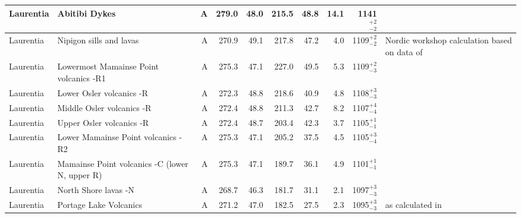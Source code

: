 \begin{longtable}{p{1 in}p{1 in}rrrrrrrp{1.5 in}}
                     Laurentia &                                    Abitibi Dykes &      A &     279.0 &      48.0 & 215.5 &  48.8 &      14.1 &     1141$^{+2}_{-2}$ &                                  \cite{Ernst1993a} \\ \hline
                     Laurentia &                          Nipigon sills and lavas &      A &     270.9 &      49.1 & 217.8 &  47.2 &       4.0 &     1109$^{+2}_{-2}$ &  Nordic workshop calculation based on data of \cite{Palmer1970a, Robertson1971a, Pesonen1979a, Pesonen1979b, Middleton2004a, Borradaile2006a} \\ \hline
                     Laurentia &           Lowermost Mamainse Point volcanics -R1 &      A &     275.3 &      47.1 & 227.0 &  49.5 &       5.3 &     1109$^{+2}_{-3}$ &                         \cite{Swanson-Hysell2014a} \\ \hline
                     Laurentia &                         Lower Osler volcanics -R &      A &     272.3 &      48.8 & 218.6 &  40.9 &       4.8 &     1108$^{+3}_{-3}$ &                         \cite{Swanson-Hysell2014b} \\ \hline
                     Laurentia &                        Middle Osler volcanics -R &      A &     272.4 &      48.8 & 211.3 &  42.7 &       8.2 &     1107$^{+4}_{-4}$ &                         \cite{Swanson-Hysell2014b} \\ \hline
                     Laurentia &                         Upper Osler volcanics -R &      A &     272.4 &      48.7 & 203.4 &  42.3 &       3.7 &     1105$^{+1}_{-1}$ &  \cite{Halls1974a, Swanson-Hysell2014b, Swanson-Hysell2019a} \\ \hline
                     Laurentia &               Lower Mamainse Point volcanics -R2 &      A &     275.3 &      47.1 & 205.2 &  37.5 &       4.5 &     1105$^{+3}_{-4}$ &                         \cite{Swanson-Hysell2014a} \\ \hline
                     Laurentia &   Mamainse Point volcanics -C (lower N, upper R) &      A &     275.3 &      47.1 & 189.7 &  36.1 &       4.9 &     1101$^{+1}_{-1}$ &                         \cite{Swanson-Hysell2014a} \\ \hline
                     Laurentia &                             North Shore lavas -N &      A &     268.7 &      46.3 & 181.7 &  31.1 &       2.1 &     1097$^{+3}_{-3}$ &              \cite{Tauxe2009a,Swanson-Hysell2019a} \\ \hline
                     Laurentia &                           Portage Lake Volcanics &      A &     271.2 &      47.0 & 182.5 &  27.5 &       2.3 &     1095$^{+3}_{-3}$ &  \cite{Books1972a, Hnat2006a} as calculated in \cite{Swanson-Hysell2019a} \\ \hline

\end{longtable}
